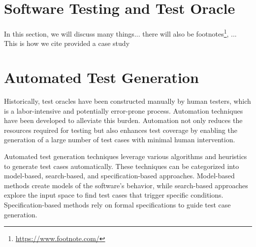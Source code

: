 \section{Software Testing and Test Oracle}
\label{sec:software_testing_and_oracle}
\vspace{0.2 cm}

In this section, we will discuss many things... there will also be footnotes\footnote{ \url{https://www.footnote.com/} }, ...
This is how we cite\cite{Nguyen2019} provided a case study

\section{Automated Test Generation}
\label{sec:automated_test_generation}
\vspace{0.2 cm}

Historically, test oracles have been constructed manually by human testers, which is a labor-intensive and potentially error-prone process. Automation techniques have been developed to alleviate this burden. Automation not only reduces the resources required for testing but also enhances test coverage by enabling the generation of a large number of test cases with minimal human intervention.

Automated test generation techniques leverage various algorithms and heuristics to generate test cases automatically. These techniques can be categorized into model-based, search-based, and specification-based approaches. Model-based methods create models of the software's behavior, while search-based approaches explore the input space to find test cases that trigger specific conditions. Specification-based methods rely on formal specifications to guide test case generation.